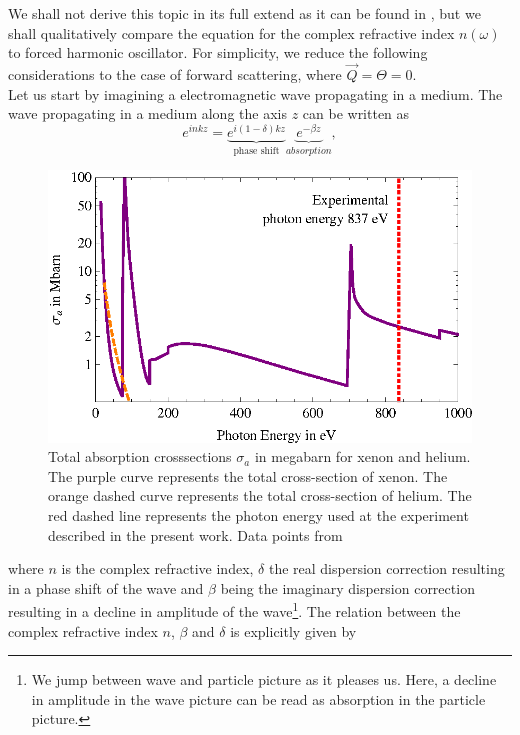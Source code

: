 We shall not derive this topic in its full extend as it can be found in \citep[see][p. 55ff]{Attwood-2007-CUP}, but we shall qualitatively compare the equation for the complex refractive index $n\left(\omega\right)$ to forced harmonic oscillator. For simplicity, we reduce the following considerations to the case of forward scattering, where $\vec{Q}=\Theta=0$.\\
Let us start by imagining a electromagnetic wave propagating in a medium. The wave propagating in a medium along the axis $z$ can be written as
\begin{equation}
e^{i n k z}= \underbrace{e^{i \left(1-\delta\right)k z}}_{\text{phase shift}}\underbrace{e^{-\beta z}}_{absorption},
\label{eq:wave-in-medium}
\end{equation}
\begin{figure}
	\centering
		\includegraphics[width=1.00\textwidth]{images/photoionization.eps}
	\caption[Total absorption cross-sections for helium and xenon.]{Total absorption crosssections $\sigma_{a}$ in megabarn for xenon and helium. The purple curve represents the total cross-section of xenon. The orange dashed curve represents the total cross-section of helium. The red dashed line represents the photon energy used at the experiment described in the present work. Data points from \citep{Elettra-2016-Website,Yeh-1985-AtmDat,Yeh-1993-GBSP}}
	\label{fig:photoionization}
\end{figure}
where $n$ is the complex refractive index, $\delta$ the real dispersion correction resulting in a phase shift of the wave and $\beta$ being the imaginary dispersion correction resulting in a decline in amplitude of the wave\footnote{We jump between wave and particle picture as it pleases us. Here, a decline in amplitude in the wave picture can be read as absorption in the particle picture.}. The relation between the complex refractive index $n$, $\beta$ and $\delta$ is explicitly given by
